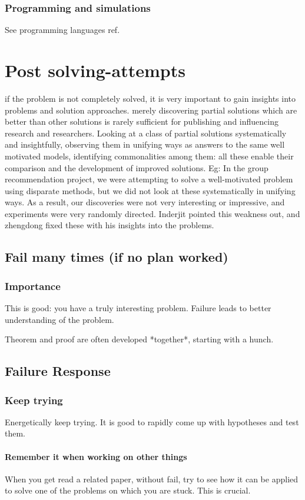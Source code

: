 \documentclass[oneside, article]{memoir}
\begin{document}
\subsection{Programming and simulations}
See programming languages ref.

\chapter{Post solving-attempts}
if the problem is not completely solved, it is very important to gain insights into problems and solution approaches. merely discovering partial solutions which are better than other solutions is rarely sufficient for publishing and influencing research and researchers. Looking at a class of partial solutions systematically and insightfully, observing them in unifying ways as answers to the same well motivated models, identifying commonalities among them: all these enable their comparison and the development of improved solutions. Eg: In the group recommendation project, we were attempting to solve a well-motivated problem using disparate methods, but we did not look at these systematically in unifying ways. As a result, our discoveries were not very interesting or impressive, and experiments were very randomly directed. Inderjit pointed this weakness out, and zhengdong fixed these with his insights into the problems.

\section{Fail many times (if no plan worked)}
\subsection{Importance}
This is good: you have a truly interesting problem. Failure leads to better understanding of the problem.

Theorem and proof are often developed *together*, starting with a hunch.

\section{Failure Response}
\subsection{Keep trying}
Energetically keep trying. It is good to rapidly come up with hypotheses and test them.

\subsubsection{Remember it when working on other things}
When you get read a related paper, without fail, try to see how it can be applied to solve one of the problems on which you are stuck. This is crucial.
\end{document}
